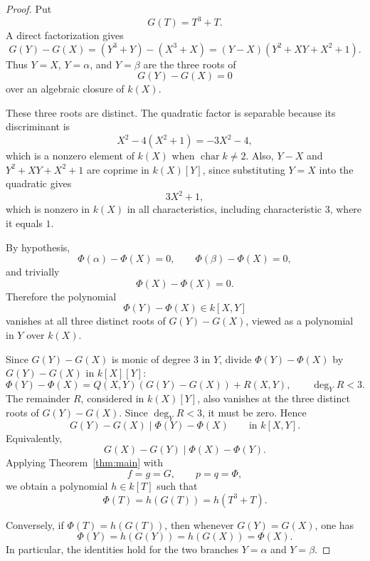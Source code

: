 \documentclass[11pt]{article}
\theoremstyle{plain}
\theoremstyle{definition}
\theoremstyle{remark}
\begin{document}
\begin{proof}
Put
\[
    G(T)=T^3+T.
\]
A direct factorization gives
\[
    G(Y)-G(X)
    =
    (Y^3+Y)-(X^3+X)
    =
    (Y-X)(Y^2+XY+X^2+1).
\]
Thus \(Y=X\), \(Y=\alpha\), and \(Y=\beta\) are the three roots of
\[
    G(Y)-G(X)=0
\]
over an algebraic closure of \(k(X)\).

These three roots are distinct. The quadratic factor is separable because its discriminant is
\[
    X^2-4(X^2+1)=-3X^2-4,
\]
which is a nonzero element of \(k(X)\) when \(\operatorname{char} k\neq 2\). Also, \(Y-X\) and \(Y^2+XY+X^2+1\) are coprime in \(k(X)[Y]\), since substituting \(Y=X\) into the quadratic gives
\[
    3X^2+1,
\]
which is nonzero in \(k(X)\) in all characteristics, including characteristic \(3\), where it equals \(1\).

By hypothesis,
\[
    \Phi(\alpha)-\Phi(X)=0,
    \qquad
    \Phi(\beta)-\Phi(X)=0,
\]
and trivially
\[
    \Phi(X)-\Phi(X)=0.
\]
Therefore the polynomial
\[
    \Phi(Y)-\Phi(X)\in k[X,Y]
\]
vanishes at all three distinct roots of \(G(Y)-G(X)\), viewed as a polynomial in \(Y\) over \(k(X)\).

Since \(G(Y)-G(X)\) is monic of degree \(3\) in \(Y\), divide \(\Phi(Y)-\Phi(X)\) by \(G(Y)-G(X)\) in \(k[X][Y]\):
\[
    \Phi(Y)-\Phi(X)
    =
    Q(X,Y)(G(Y)-G(X))+R(X,Y),
    \qquad
    \deg_Y R<3.
\]
The remainder \(R\), considered in \(k(X)[Y]\), also vanishes at the three distinct roots of \(G(Y)-G(X)\). Since \(\deg_Y R<3\), it must be zero. Hence
\[
    G(Y)-G(X)
    \mid
    \Phi(Y)-\Phi(X)
    \qquad \text{in } k[X,Y].
\]
Equivalently,
\[
    G(X)-G(Y)
    \mid
    \Phi(X)-\Phi(Y).
\]
Applying Theorem~\ref{thm:main} with
\[
    f=g=G,
    \qquad
    p=q=\Phi,
\]
we obtain a polynomial \(h\in k[T]\) such that
\[
    \Phi(T)=h(G(T))=h(T^3+T).
\]

Conversely, if \(\Phi(T)=h(G(T))\), then whenever \(G(Y)=G(X)\), one has
\[
    \Phi(Y)=h(G(Y))=h(G(X))=\Phi(X).
\]
In particular, the identities hold for the two branches \(Y=\alpha\) and \(Y=\beta\).
\end{proof}
\end{document}
